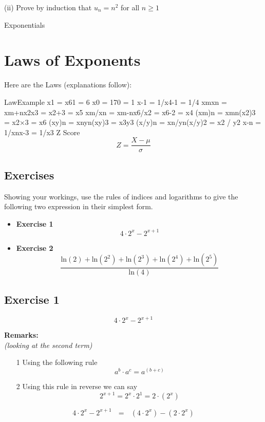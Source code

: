 \documentclass[]{report}
\begin{document}
(ii) Prove by induction that $u_n = n^2$ for all $n \geq 1$

Exponentials

\section{Laws of Exponents}
Here are the Laws (explanations follow):

LawExample
x1 = x61 = 6
x0 = 170 = 1
x-1 = 1/x4-1 = 1/4
xmxn = xm+nx2x3 = x2+3 = x5
xm/xn = xm-nx6/x2 = x6-2 = x4
(xm)n = xmn(x2)3 = x2×3 = x6
(xy)n = xnyn(xy)3 = x3y3
(x/y)n = xn/yn(x/y)2 = x2 / y2
x-n = 1/xnx-3 = 1/x3
Z Score
\[ Z = \frac{X - \mu}{\sigma} \]






\subsection{Exercises}

Showing your workings, use the rules of indices and logarithms to give the following two expression in their simplest form.
\bigskip
\begin{itemize}
\item \textbf{Exercise 1}
\[ 4 \cdot 2^x - 2^{x+1} \]
\item \textbf{Exercise 2}
\[  \frac{\mbox{ln}(2) + \mbox{ln}(2^2) + \mbox{ln}(2^3)  + \mbox{ln}(2^4) + \mbox{ln}(2^5)  }  {\mbox{ln}(4)}  \]
\end{itemize}

\subsection{Exercise 1}

\[ 4 \cdot 2^x - 2^{x+1} \]

\textbf{Remarks:}\\
\textit{(looking at the second term)}
\begin{itemize}
\item[1] Using the following rule
\[ a^b \cdot a^c = a^{(b+c)}  \] 
\item[2] Using this rule in reverse we can say
\[ 2^{x+1} = 2^x \cdot 2^1  = 2\cdot (2^x) \] 
\end{itemize}
\[ 4 \cdot 2^x - 2^{x+1} \mbox{   } = \mbox{   } (4 \cdot 2^x) -  (2\cdot 2^{x}) \]
\end{document}
